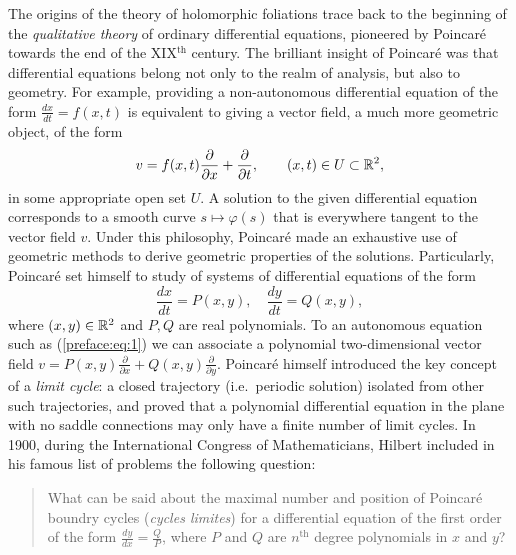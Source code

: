 \documentclass[phd,tocprelim]{cornell}
\begin{document}
The origins of the theory of holomorphic foliations trace back to the beginning of the \textit{qualitative theory} of ordinary differential equations, pioneered by Poincar\'{e} towards the end of the XIX$^{\text{th}}$ century. 
%
%
The brilliant insight of Poincar\'{e} was that differential equations belong not only to the realm of analysis, but also to geometry. For example, providing a non-autonomous differential equation of the form $\displaystyle\frac{dx}{dt}=f(x,t)$ is equivalent to giving a vector field, a much more geometric object, of the form
 \[ v = f(x,t)\frac{\partial}{\partial x} + \frac{\partial}{\partial t}, \qquad (x,t)\in U\subset\mathbb{R}^2, \]
in some appropriate open set $U$. A solution to the given differential equation corresponds to a smooth curve $s\mapsto\varphi(s)$ that is everywhere tangent to the vector field $v$. Under this philosophy, Poincar\'{e} made an exhaustive use of geometric methods to derive geometric properties of the solutions. Particularly, Poincar\'{e} set himself to study of systems of differential equations of the form 
\begin{equation}\label{preface:eq:1}
 \frac{dx}{dt}=P(x,y), \quad \frac{dy}{dt}=Q(x,y),
\end{equation}
where $(x,y)\in\mathbb{R}^2$ and $P,Q$ are real polynomials. To an autonomous equation such as (\ref{preface:eq:1}) we can associate a polynomial two-dimensional vector field $\displaystyle v=P(x,y)\frac{\partial}{\partial x} + Q(x,y)\frac{\partial}{\partial y}$. Poincar\'{e} himself introduced the key concept of a \textit{limit cycle}: a closed trajectory (i.e.~periodic solution) isolated from other such trajectories, and proved that a polynomial differential equation in the plane with no saddle connections may only have a finite number of limit cycles. 
%
%
In 1900, during the International Congress of Mathematicians, Hilbert included in his famous list of problems the following question:

\bigskip
\begin{quote}
\singlespacing
 What can be said about the maximal number and position of Poincar\'{e} boundry cycles (\textit{cycles limites}) for a differential equation of the first order of the form $\frac{dy}{dx}=\frac{Q}{P}$, where $P$ and $Q$ are $n^{\text{th}}$ degree polynomials in $x$ and $y$?
\end{quote}
\end{document}
